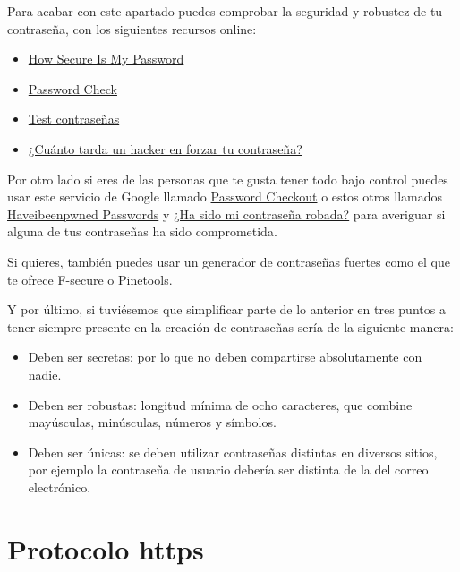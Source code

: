 \documentclass[
  a4paper,
  openany]{book}
\begin{document}
Para acabar con este apartado puedes comprobar la seguridad y robustez de tu contraseña, con los siguientes recursos online:

\begin{itemize}
\item
  \href{https://howsecureismypassword.net/}{How Secure Is My Password}
\item
  \href{https://password.kaspersky.com/}{Password Check}
\item
  \href{https://www.ontek.net/test-contrasenas/}{Test contraseñas}
\item
  \href{https://www.hivesystems.io/blog/are-your-passwords-in-the-green}{¿Cuánto tarda un hacker en forzar tu contraseña?}
\end{itemize}

Por otro lado si eres de las personas que te gusta tener todo bajo control puedes usar este servicio de Google llamado \href{https://www.blog.google/technology/safety-security/google-password-checkup-cross-account-protection/}{Password Checkout} o estos otros llamados \href{https://haveibeenpwned.com/Passwords}{Haveibeenpwned Passwords} y \href{https://www.avast.com/hackcheck}{¿Ha sido mi contraseña robada?} para averiguar si alguna de tus contraseñas ha sido comprometida.

Si quieres, también puedes usar un generador de contraseñas fuertes como el que te ofrece \href{https://www.f-secure.com/en/home/free-tools/password-generator}{F-secure} o \href{https://pinetools.com/es/generador-contrasenas}{Pinetools}.

Y por último, si tuviésemos que simplificar parte de lo anterior en tres puntos a tener siempre presente en la creación de contraseñas sería de la siguiente manera:

\begin{itemize}
\item
  Deben ser secretas: por lo que no deben compartirse absolutamente con nadie.
\item
  Deben ser robustas: longitud mínima de ocho caracteres, que combine mayúsculas, minúsculas, números y símbolos.
\item
  Deben ser únicas: se deben utilizar contraseñas distintas en diversos sitios, por ejemplo la contraseña de usuario debería ser distinta de la del correo electrónico.
\end{itemize}

\hypertarget{protocolo-https}{%
\section{Protocolo https}\label{protocolo-https}}
\end{document}
